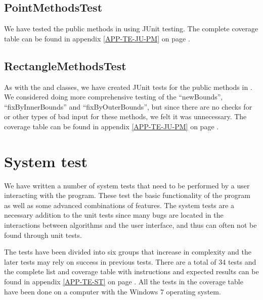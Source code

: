 \subsection{PointMethodsTest}
\label{TEST-JU-PMT}
We have tested the public methods in  using JUnit testing.
The complete coverage table can be found in appendix \ref{APP-TE-JU-PM} on page
\pageref{APP-TE-JU-PM}.

\subsection{RectangleMethodsTest}
\label{TEST-JU-RMT}
As with the  and  classes, we have created
JUnit tests for the public methods in . We considered
doing more comprehensive testing of the ``newBounds'', ``fixByInnerBounds'' and
``fixByOuterBounds'', but since there are no checks for  or other
types of bad input for these methods, we felt it was unnecessary. The coverage
table can be found in appendix \ref{APP-TE-JU-PM} on page
\pageref{APP-TE-JU-PM}.

\section{System test}
\label{TEST-ST}
We have written a number of system tests that need to be performed by a
user interacting with the program. These test the basic functionality of the
program as well as some advanced combinations of features. The system tests are
a necessary addition to the unit tests since many bugs are located in the
interactions between algorithms and the user interface, and thus can often not
be found through unit tests. 

The tests have been divided into six groups that increase in
complexity and the later tests may rely on success in previous tests. There are
a total of 34 tests and the complete list and coverage table with instructions
and expected results can be found in appendix \ref{APP-TE-ST} on page
\pageref{APP-TE-ST}. All the tests in the coverage table have been done on a
computer with the Windows 7 operating system.
